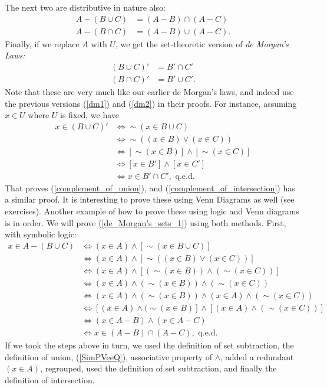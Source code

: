 The next two are distributive in nature also:
\begin{align}
A-(B\cup C)&=(A-B)\cap(A-C)\label{de_Morgan's_sets_1}\\
A-(B\cap C)&=(A-B)\cup(A-C).\label{de_Morgan's_sets_2} 
\end{align}
Finally,  if we replace $A$ with $U$, we get the set-theoretic
version of {\it de Morgan's Laws:}
\begin{align}
(B\cup C)'&=B'\cap C'\label{complement_of_union}\\
(B\cap C)'&=B'\cup C'\label{complement_of_intersection}.
\end{align}
Note that these are very much like our earlier de Morgan's laws,
and indeed use the previous versions (\ref{dm1}) and (\ref{dm2})
in their proofs.  For instance, assuming $x\in U$ where $U$ is fixed,
we have 
\begin{align*}x\in(B\cup C)'&\iff \sim(x\in B\cup C)\\
&\iff\sim((x\in B)\vee(x\in C))\\
&\iff[\sim(x\in B)]\wedge[\sim(x\in C)]\\
&\iff[x\in B']\wedge[x\in C']\\
&\iff x\in B'\cap C',\text{ q.e.d.}\end{align*}
That proves (\ref{complement_of_union}), and (\ref{complement_of_intersection})
has a similar proof.  It is interesting to prove these using Venn Diagrams
as well (see exercises).
\bex
Another example of how to prove these using logic and
Venn diagrams is in order.  We will prove (\ref{de_Morgan's_sets_1})
using both methods.  First, with symbolic logic:
\begin{align*}
x\in A-(B\cup C)&\iff(x\in A)\wedge[\sim(x\in B\cup C)]\\
 &\iff(x\in A)\wedge[\sim((x\in B)\vee(x\in C))]\\
 &\iff(x\in A)\wedge[(\sim(x\in B))\wedge(\sim(x\in C))]\\
 &\iff(x\in A)\wedge(\sim (x\in B))\wedge(\sim(x\in C))\\
 &\iff(x\in A)\wedge(\sim (x\in B))\wedge(x\in A)\wedge(\sim(x\in C))\\
 &\iff[(x\in A)\wedge(\sim (x\in B)]\wedge[(x\in A)\wedge(\sim(x\in C))]\\
 &\iff(x\in A-B)\wedge(x\in A-C)\\
 &\iff x\in (A-B)\cap(A-C),\text{ q.e.d.}
\end{align*}
If we took the steps above in turn, we used the definition
of set subtraction, the definition of union, (\ref{SimPVeeQ}),
associative property of $\wedge$, added a redundant $(x\in A)$,
regrouped, used the definition of set subtraction, and finally
the definition of intersection.

